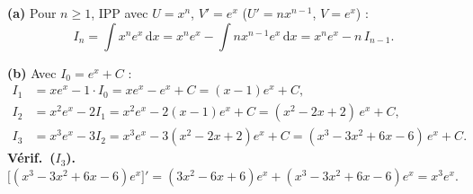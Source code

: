 \documentclass[11pt,a4paper]{article}
\newcommand{\dd}{\mathrm{d}}
\begin{document}
\begin{corr}
\textbf{(a)} Pour $n\geqslant 1$, IPP avec $U=x^{n}$, $V'=e^{x}$ ($U'=n x^{n-1}$, $V=e^{x}$) :
\[
I_{n}=\int x^{n}e^{x}\,\dd x=x^{n}e^{x}-\int n x^{n-1}e^{x}\,\dd x=\boxed{x^{n}e^{x}-n\,I_{n-1}.}
\]

\textbf{(b)} Avec $I_{0}=e^{x}+C$ :
\begin{align*}
I_{1}&=x e^{x}-1\cdot I_{0}=x e^{x}-e^{x}+C=(x-1)e^{x}+C,\\
I_{2}&=x^{2}e^{x}-2 I_{1}=x^{2}e^{x}-2(x-1)e^{x}+C=(x^{2}-2x+2)\,e^{x}+C,\\
I_{3}&=x^{3}e^{x}-3 I_{2}=x^{3}e^{x}-3(x^{2}-2x+2)e^{x}+C=(x^{3}-3x^{2}+6x-6)\,e^{x}+C.
\end{align*}
\textbf{Vérif.\ ($I_3$).} $\bigl[(x^{3}-3x^{2}+6x-6)e^{x}\bigr]'=(3x^{2}-6x+6)e^{x}+(x^{3}-3x^{2}+6x-6)e^{x}=x^{3}e^{x}$. \checkmark
\end{corr}
\end{document}
